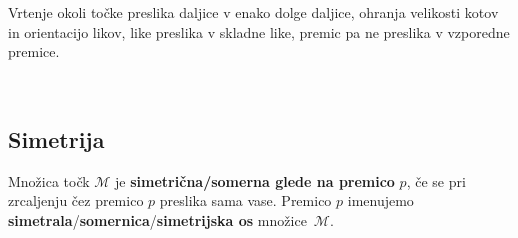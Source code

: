 \begin{figure}[H]
                \end{figure}

                
            
                Vrtenje okoli točke preslika daljice v enako dolge daljice, ohranja velikosti kotov in orientacijo likov, like preslika v skladne like, premic pa ne preslika v vzporedne premice.


        
~\\


        
        \subsection*{Simetrija}

                Množica točk $\mathcal{M}$ je \textbf{simetrična/somerna glede na premico} $p$, 
                če se pri zrcaljenju čez premico $p$ preslika sama vase. 
                Premico $p$ imenujemo \textbf{simetrala}/\textbf{somernica}/\textbf{simetrijska os} množice~$\mathcal{M}$. 
                 ~\\      

